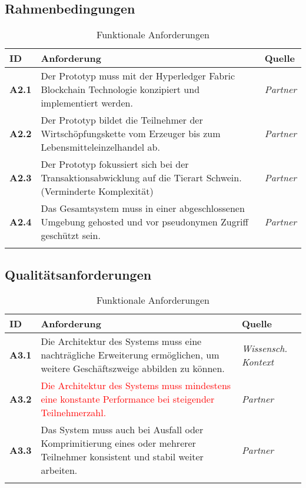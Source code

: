 \subsection{Rahmenbedingungen}
\begin{table}[H]
    \begin{tabularx}{\textwidth}{@{}lXp{2cm}@{}}
        \toprule
        ID                & Anforderung & Quelle \\
        \midrule
        \textbf{A2.1}              & Der Prototyp muss mit der Hyperledger Fabric Blockchain Technologie konzipiert und implementiert werden.                     & \textit{Partner}                \\ \addlinespace
        \textbf{A2.2}              & Der Prototyp bildet die Teilnehmer der Wirtschöpfungskette vom Erzeuger bis zum Lebensmitteleinzelhandel ab.                     & \textit{Partner}                \\ \addlinespace
        \textbf{A2.3}              & Der Prototyp fokussiert sich bei der Transaktionsabwicklung auf die Tierart Schwein. (Verminderte Komplexität)                     & \textit{Partner}                \\ \addlinespace
        \textbf{A2.4}\label{req:A2.4}              & Das Gesamtsystem muss in einer abgeschlossenen Umgebung gehosted und vor pseudonymen Zugriff geschützt sein.                     & \textit{Partner}                \\ \addlinespace
        \bottomrule
    \end{tabularx}
    \caption{Funktionale Anforderungen}
    \label{tab:functional-requirements}
\end{table}

\subsection{Qualitätsanforderungen}
\begin{table}[H]
    \begin{tabularx}{\textwidth}{@{}lXp{2cm}@{}}
        \toprule
        ID                & Anforderung & Quelle \\
        \midrule
        \textbf{A3.1}              & Die Architektur des Systems muss eine nachträgliche Erweiterung ermöglichen, um weitere Geschäftszweige abbilden zu können.                     & \textit{Wissensch. Kontext}                \\ \addlinespace
        \textbf{A3.2}              & \textcolor{red}{Die Architektur des Systems muss mindestens eine konstante Performance bei steigender Teilnehmerzahl.}                     & \textit{Partner}                \\ \addlinespace
        \textbf{A3.3}              & Das System muss auch bei Ausfall oder Komprimitierung eines oder mehrerer Teilnehmer konsistent und stabil weiter arbeiten.                    & \textit{Partner}                \\ \addlinespace
        \bottomrule
    \end{tabularx}
    \caption{Funktionale Anforderungen}
    \label{tab:functional-requirements}
\end{table}

